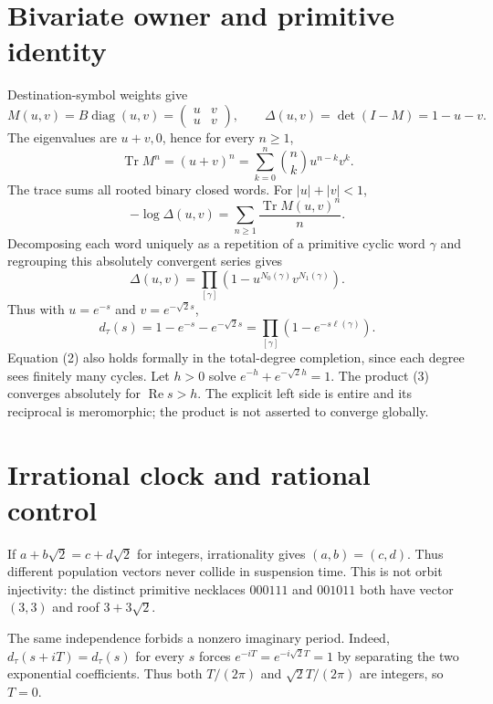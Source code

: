 \documentclass[10pt]{article}
\begin{document}
\section{Bivariate owner and primitive identity}
Destination-symbol weights give
\[
M(u,v)=B\operatorname{diag}(u,v)=
\begin{pmatrix}u&v\\u&v\end{pmatrix},\qquad
\Delta(u,v)=\det(I-M)=1-u-v.
\]
The eigenvalues are $u+v,0$, hence for every $n\ge1$,
\begin{equation}
\operatorname{Tr}M^n=(u+v)^n=
\sum_{k=0}^n\binom nk u^{n-k}v^k. \tag{1}
\end{equation}
The trace sums all rooted binary closed words.  For $|u|+|v|<1$,
\[
-\log\Delta(u,v)=\sum_{n\ge1}\frac{\operatorname{Tr}M(u,v)^n}{n}.
\]
Decomposing each word uniquely as a repetition of a primitive cyclic word
$\gamma$ and regrouping this absolutely convergent series gives
\begin{equation}
\Delta(u,v)=\prod_{[\gamma]}
(1-u^{N_0(\gamma)}v^{N_1(\gamma)}). \tag{2}
\end{equation}
Thus with $u=e^{-s}$ and $v=e^{-\sqrt2s}$,
\begin{equation}
d_\tau(s)=1-e^{-s}-e^{-\sqrt2s}
=\prod_{[\gamma]}(1-e^{-s\ell(\gamma)}). \tag{3}
\end{equation}
Equation (2) also holds formally in the total-degree completion, since each
degree sees finitely many cycles.  Let $h>0$ solve
$e^{-h}+e^{-\sqrt2h}=1$.  The product (3) converges absolutely for
$\operatorname{Re}s>h$.  The explicit left side is entire and its reciprocal
is meromorphic; the product is not asserted to converge globally.

\section{Irrational clock and rational control}
If $a+b\sqrt2=c+d\sqrt2$ for integers, irrationality gives $(a,b)=(c,d)$.
Thus different population vectors never collide in suspension time.  This is
not orbit injectivity: the distinct primitive necklaces $000111$ and $001011$
both have vector $(3,3)$ and roof $3+3\sqrt2$.

The same independence forbids a nonzero imaginary period.  Indeed,
$d_\tau(s+iT)=d_\tau(s)$ for every $s$ forces
$e^{-iT}=e^{-i\sqrt2T}=1$ by separating the two exponential coefficients.
Thus both $T/(2\pi)$ and $\sqrt2T/(2\pi)$ are integers, so $T=0$.
\end{document}
